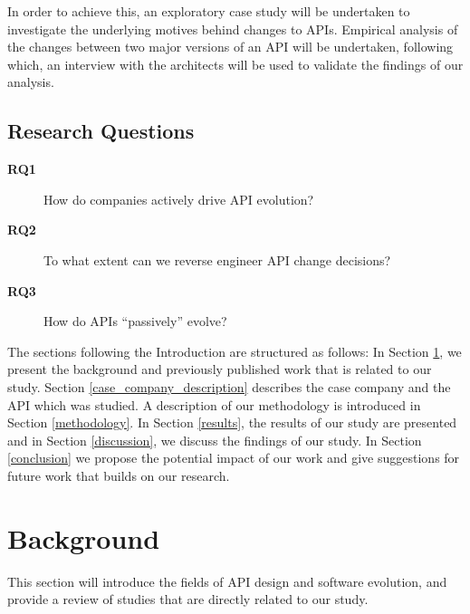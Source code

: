 \documentclass{sig-alternate}
\begin{document}
In order to achieve this, an exploratory case study will be undertaken to investigate the underlying motives behind changes to APIs. Empirical analysis of the changes between two major versions of an API will be undertaken, following which, an interview with the architects will be used to validate the findings of our analysis. 



\subsection{Research Questions} \label{rqs}
\begin{description}
\item[\textbf{RQ1}] How do companies actively drive API evolution?
\item[\textbf{RQ2}] To what extent can we reverse engineer API change decisions?
\item[\textbf{RQ3}] How do APIs ``passively'' evolve?


\end{description}

The sections following the Introduction are structured as follows: In Section \ref{existing_literature}, we present the background and previously published work that is related to our study. Section \ref{case_company_description} describes the case company and the API which was studied. A description of our methodology is introduced in Section \ref{methodology}. In Section \ref{results}, the results of our study are presented and in Section \ref{discussion}, we discuss the findings of our study. In Section \ref{conclusion} we propose the potential impact of our work and give suggestions for future work that builds on our research. 

\section{Background} \label{existing_literature}
This section will introduce the fields of API design and software evolution, and provide a review of studies that are directly related to our study. 
\end{document}

